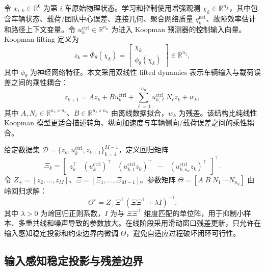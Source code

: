 \documentclass[twocolumn,3p,times,procedia]{elsarticle}
\newcommand{\R}{\mathbb{R}}
\begin{document}
令 $x_{i,k}\in\R^6$ 为第 $i$ 车原始物理状态。学习和控制使用增强观测 $\chi_k\in\R^{n_\chi}$，其中包含车辆状态、载荷/团队中心误差、连接几何、聚合网络质量 $q_k^{\mathrm{net}}$、故障效率估计和路径上下文变量。令 $u_k^{\mathrm{ctrl}}\in\R^{n_u}$ 为进入 Koopman 预测器的控制输入向量。Koopman lifting 定义为
\begin{equation}
z_k=\Phi_\theta(\chi_k)=\begin{bmatrix}\chi_k\\ \phi_\theta(\chi_k)\end{bmatrix}\in\R^{n_z},
\label{eq:koopman_lift}
\end{equation}
其中 $\phi_\theta$ 为神经网络特征。本文采用双线性 lifted dynamics 表示车辆输入与载荷误差之间的乘性耦合：
\begin{equation}
z_{k+1}=A z_k+B u_k^{\mathrm{ctrl}}+\sum_{\ell=1}^{n_u} u_{k,\ell}^{\mathrm{ctrl}} N_\ell z_k+w_k,
\label{eq:bilinear_koopman}
\end{equation}
其中 $A,N_\ell\in\R^{n_z\times n_z}$、$B\in\R^{n_z\times n_u}$ 由离线数据拟合，$w_k$ 为残差。该结构比纯线性 Koopman 模型更适合描述转角、纵向加速度与车辆侧向/载荷误差之间的乘性耦合。

给定数据集 $\mathcal D=\{z_k,u_k^{\mathrm{ctrl}},z_{k+1}\}_{k=1}^{M-1}$，定义回归矩阵
\begin{equation}
\Xi_k=\begin{bmatrix}z_k^\top&(u_k^{\mathrm{ctrl}})^\top&(u_{k,1}^{\mathrm{ctrl}}z_k)^\top&\cdots&(u_{k,n_u}^{\mathrm{ctrl}}z_k)^\top\end{bmatrix}^\top .
\label{eq:bilinear_regressor}
\end{equation}
令 $Z_+=[z_2,\ldots,z_M]$、$\Xi=[\Xi_1,\ldots,\Xi_{M-1}]$。参数矩阵 $\Theta=[A\;B\;N_1\;\cdots N_{n_u}]$ 由岭回归求解：
\begin{equation}
\Theta^\star=Z_+\Xi^\top(\Xi\Xi^\top+\lambda I)^{-1}.
\label{eq:ridge_fit}
\end{equation}
其中 $\lambda>0$ 为岭回归正则系数，$I$ 为与 $\Xi\Xi^\top$ 维度匹配的单位阵，用于抑制小样本、多重共线和噪声导致的参数放大。在线阶段采用滑动窗口残差更新，只允许在输入感知稳定投影和约束边界内微调 $\Theta$，避免自适应过程破坏闭环可行性。

\subsection{输入感知稳定投影与残差边界}
\end{document}
